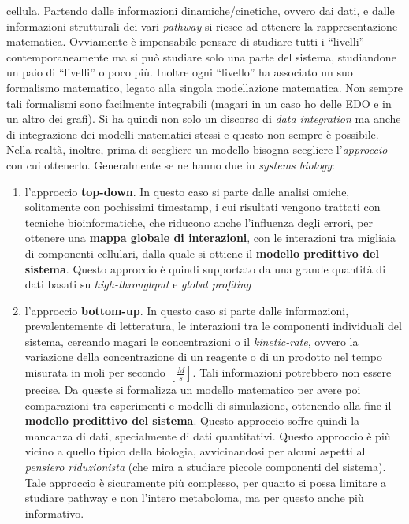 \documentclass[a4paper,12pt, oneside]{book}
\begin{document}
cellula. Partendo dalle informazioni dinamiche/cinetiche, ovvero dai dati, e
dalle informazioni strutturali dei vari \textit{pathway} si riesce ad ottenere
la rappresentazione matematica. Ovviamente è impensabile pensare di studiare
tutti i ``livelli'' contemporaneamente ma si può studiare solo una parte del
sistema, studiandone un paio di ``livelli'' o poco più. Inoltre ogni ``livello''
ha associato un suo formalismo matematico, legato alla singola modellazione
matematica. Non sempre tali formalismi sono facilmente integrabili (magari in un
caso ho delle EDO e in un altro dei grafi). Si ha quindi non solo un discorso di
\textit{data integration} ma anche di integrazione dei modelli matematici stessi
e questo non sempre è possibile.\\
Nella realtà, inoltre, prima di scegliere un modello bisogna scegliere
l'\textit{approccio} con cui ottenerlo. Generalmente se ne hanno due in
\textit{systems biology}: 
\begin{enumerate}
  \item l'approccio \textbf{top-down}. In questo caso si parte dalle analisi
  omiche, solitamente con pochissimi timestamp, i cui risultati vengono trattati
  con tecniche bioinformatiche, che riducono anche l'influenza degli errori, per 
  ottenere una \textbf{mappa globale di interazioni}, con le interazioni tra
  migliaia di componenti cellulari, dalla quale si ottiene il
  \textbf{modello predittivo del sistema}. Questo approccio è quindi supportato
  da una grande quantità di dati basati su \textit{high-throughput} e
  \textit{global profiling}
  \item l'approccio \textbf{bottom-up}. In questo caso si parte dalle
  informazioni, prevalentemente di letteratura, le interazioni tra le componenti
  individuali del sistema, cercando magari le concentrazioni o il
  \textit{kinetic-rate}, ovvero la variazione della concentrazione di un
  reagente o di un prodotto nel tempo misurata in moli per secondo
  $\left[\frac{M}{s}\right]$. Tali informazioni potrebbero non essere
  precise. Da  
  queste si formalizza un modello matematico per 
  avere poi comparazioni tra esperimenti e modelli di simulazione, ottenendo
  alla fine il \textbf{modello predittivo del sistema}. Questo approccio soffre
  quindi la mancanza di dati, specialmente di dati quantitativi. Questo
  approccio è più vicino a quello tipico della biologia, avvicinandosi per
  alcuni aspetti al \textit{pensiero riduzionista} (che mira a studiare piccole
  componenti del sistema).\\
  Tale approccio è sicuramente più complesso, per quanto si possa limitare a
  studiare pathway e non l'intero metaboloma, ma per questo anche più
  informativo. 
\end{enumerate}
\end{document}
